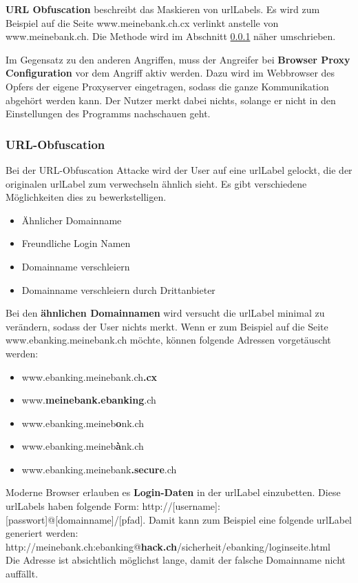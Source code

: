 \textbf{URL Obfuscation} beschreibt das Maskieren von \Glspl{urlLabel}. Es wird zum Beispiel auf die Seite www.meinebank.ch.cx verlinkt anstelle von www.meinebank.ch. Die Methode wird im Abschnitt \ref{sec:phishing:angriffvorbereiten:attacken:urlobfuscationattacke} näher umschrieben.

Im Gegensatz zu den anderen Angriffen, muss der Angreifer bei \textbf{Browser Proxy Configuration} vor dem Angriff aktiv werden. Dazu wird im Webbrowser des Opfers der eigene Proxyserver eingetragen, sodass die ganze Kommunikation abgehört werden kann. Der Nutzer merkt dabei nichts, solange er nicht in den Einstellungen des Programms nachschauen geht.

\subsubsection{URL-Obfuscation}
\label{sec:phishing:angriffvorbereiten:attacken:urlobfuscationattacke}
Bei der URL-Obfuscation Attacke wird der User auf eine \Gls{urlLabel} gelockt, die der originalen \Gls{urlLabel} zum verwechseln ähnlich sieht. Es gibt verschiedene Möglichkeiten dies zu bewerkstelligen.
\begin{itemize}
\item Ähnlicher Domainname 
\item Freundliche Login Namen
\item Domainname verschleiern
\item Domainname verschleiern durch Drittanbieter
\end{itemize}

Bei den \textbf{ähnlichen Domainnamen} wird versucht die \Gls{urlLabel} minimal zu verändern, sodass der User nichts merkt. Wenn er zum Beispiel auf die Seite www.ebanking.meinebank.ch möchte, können folgende Adressen vorgetäuscht werden:
\begin{itemize}
\item www.ebanking.meinebank.ch\textbf{.cx}
\item www.\textbf{meinebank.ebanking}.ch
\item www.ebanking.meineb\textbf{o}nk.ch
\item www.ebanking.meineb\textbf{{à}}nk.ch
\item www.ebanking.meinebank\textbf{.secure}.ch
\end{itemize}

Moderne Browser erlauben es \textbf{Login-Daten} in der \Gls{urlLabel} einzubetten. Diese \Glspl{urlLabel} haben folgende Form: http://[username]:[passwort]@[domainname]/[pfad]. Damit kann zum Beispiel eine folgende \Gls{urlLabel} generiert werden:\\
http://meinebank.ch:ebanking@\textbf{hack.ch}/sicherheit/ebanking/loginseite.html\\
Die Adresse ist absichtlich möglichst lange, damit der falsche Domainname nicht auffällt.

